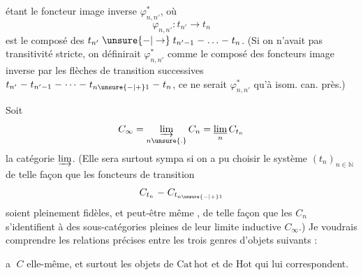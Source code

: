 
étant le foncteur image inverse $\varphi_{n,n'}^*$, où
\[
\varphi_{n,n'}:t_{n'}\longrightarrow t_n
\]
est le composé des $t_{n'}\mathrel{\unsure{-|\to}}t_{n'-1}\mathrel{-}\ldots\mathrel{-}t_n$. (Si on n'avait pas transitivité stricte, on définirait $\varphi_{n,n'}^*$ comme le composé des foncteurs image inverse par les flèches de transition successives $t_{n'}\mathrel{-}t_{n'-1}\mathrel{-}\cdots\mathrel{-}t_{n\unsure{-|+}1}\mathrel{-}t_n$, ce ne serait $\varphi_{n,n'}^*$ qu'à isom. can. près.)

Soit 
\[
C_\infty=\underset{n\unsure{.}}{\varinjlim}\,C_n=\underset{n}{\underline{\lim}}\,C_{t_n}
\]
la catégorie $\varinjlim$. (Elle sera surtout sympa si on a pu choisir le système $(t_n)_{n\in\mathbb N}$ de telle façon que les foncteurs de transition
\[
C_{t_n}\mathrel{-}C_{t_{n\unsure{-|+}1}}
\]
soient pleinement fidèles, et peut-être même , de telle façon que les $C_n$ s'identifient à des sous-catégories pleines de leur limite inductive $C_\infty$.) Je voudrais comprendre les relations précises entre les trois genres d'objets suivants :

\textcircled{a} $C$ elle-même,   et surtout les objets de $\mathrm{Cat\,hot}$ et de $\mathrm{Hot}$ qui lui correspondent.

